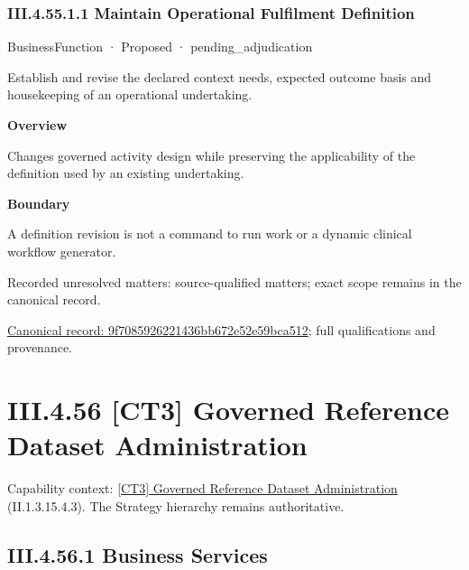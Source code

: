 \subsubsection*{III.4.55.1.1 Maintain Operational Fulfilment Definition}
\label{navigation:III.4.55.1.1}

\label{element:9f7085926221436bb672e52e59bca512}
{\small BusinessFunction · Proposed · pending\_adjudication}\par

Establish and revise the declared context needs, expected outcome basis and housekeeping of an operational undertaking.



\textbf{Overview}



Changes governed activity design while preserving the applicability of the definition used by an existing undertaking.



\textbf{Boundary}



A definition revision is not a command to run work or a dynamic clinical workflow generator.


{\small Recorded unresolved matters: source-qualified matters; exact scope remains in the canonical record.}\par
{\footnotesize \href{../../../../continuum/business/business-function/9f7085926221436bb672e52e59bca512.md}{Canonical record: 9f7085926221436bb672e52e59bca512}; full qualifications and provenance.}\par
\section*{III.4.56 [CT3] Governed Reference Dataset Administration}
\label{navigation:III.4.56}

{\small Capability context: \hyperref[element:682b8684ad9e49d5a5c348a148081607]{[CT3] Governed Reference Dataset Administration} (II.1.3.15.4.3). The Strategy hierarchy remains authoritative.}\par
\subsection*{III.4.56.1 Business Services}
\label{navigation:III.4.56.1}

